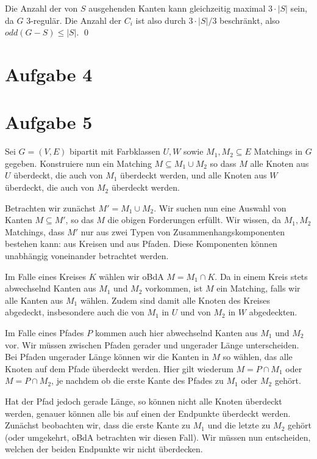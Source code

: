 \documentclass[a4paper]{article}
\begin{document}
Die Anzahl der von $S$ ausgehenden Kanten kann gleichzeitig maximal
$3 \cdot |S|$ sein, da $G$ 3-regulär.
Die Anzahl der $C_i$ ist also durch $3 \cdot |S| / 3$ beschränkt, also
$odd(G - S) \leq |S|$.
\qed



\section{Aufgabe 4}

\section{Aufgabe 5}
Sei $G = (V, E)$ bipartit mit Farbklassen $U, W$ sowie $M_1, M_2 \subseteq E$ Matchings in $G$
gegeben. Konstruiere nun ein Matching $M \subseteq M_1 \cup M_2$ so dass $M$
alle Knoten aus $U$ überdeckt, die auch von $M_1$ überdeckt werden, und alle
Knoten aus $W$ überdeckt, die auch von $M_2$ überdeckt werden.

Betrachten wir zunächst $M' = M_1 \cup M_2$. Wir suchen nun eine Auswahl von
Kanten $M \subseteq M'$, so das $M$ die obigen Forderungen erfüllt.
Wir wissen, da $M_1, M_2$
Matchings, dass $M'$ nur aus zwei Typen von Zusammenhangskomponenten
bestehen kann: aus Kreisen und aus Pfaden. Diese Komponenten können
unabhängig voneinander betrachtet werden.

Im Falle eines Kreises $K$ wählen wir oBdA $M = M_1 \cap K$. Da in einem
Kreis stets abwechselnd Kanten aus $M_1$ und $M_2$ vorkommen, ist $M$ ein
Matching, falls wir alle Kanten aus $M_1$ wählen. Zudem sind damit alle
Knoten des Kreises abgedeckt, insbesondere auch die von $M_1$ in $U$ und von
$M_2$ in $W$ abgedeckten.

Im Falle eines Pfades $P$ kommen auch hier abwechselnd Kanten aus $M_1$ und
$M_2$ vor. Wir müssen zwischen Pfaden gerader und ungerader Länge unterscheiden.
Bei Pfaden ungerader Länge können wir die Kanten in $M$ so wählen, das alle
Knoten auf dem Pfade überdeckt werden. Hier gilt wiederum $M = P \cap M_1$
oder $M = P \cap M_2$, je nachdem ob die erste Kante des Pfades zu $M_1$
oder $M_2$ gehört.

Hat der Pfad jedoch gerade Länge, so können nicht alle Knoten überdeckt
werden, genauer können alle bis auf einen der Endpunkte überdeckt werden.
Zunächst beobachten wir, dass die erste Kante zu $M_1$ und die
letzte zu $M_2$ gehört (oder umgekehrt, oBdA betrachten wir diesen Fall).
Wir müssen nun entscheiden, welchen der beiden Endpunkte wir nicht
überdecken.
\end{document}
